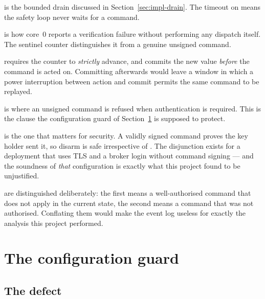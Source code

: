 \begin{description}[leftmargin=1.6em,itemsep=4pt]
  \item[The loop header] is the bounded drain discussed in Section~\ref{sec:impl-drain}. The
         timeout on  means the safety loop never waits for a
        command.
  \item[The \code{cmd\_badmac} marker] is how core~0 reports a verification failure without
        performing any dispatch itself. The sentinel counter  distinguishes it
        from a genuine unsigned command.
  \item[The replay check] requires the counter to \emph{strictly} advance, and
         commits the new value \emph{before} the command is acted on.
        Committing afterwards would leave a window in which a power interruption between
        action and commit permits the same command to be replayed.
  \item[The \code{AUTH\_COMMANDS} branch] is where an unsigned command is refused when
        authentication is required. This is the clause the configuration guard of
        Section~\ref{sec:impl-guard} is supposed to protect.
  \item[The \code{DISARM} case] is the one that matters for security. A validly signed command
        proves the key holder sent it, so disarm is safe irrespective of
        . The disjunction exists for a deployment that uses TLS and
        a broker login without command signing — and the soundness of \emph{that} configuration
        is exactly what this project found to be unjustified.
  \item[\code{cmd\_ignored} versus \code{cmd\_rejected}] are distinguished deliberately: the
        first means a well-authorised command that does not apply in the current state, the
        second means a command that was not authorised. Conflating them would make the event
        log useless for exactly the analysis this project performed.
\end{description}

\section{The configuration guard}\label{sec:impl-guard}

\subsection{The defect}

